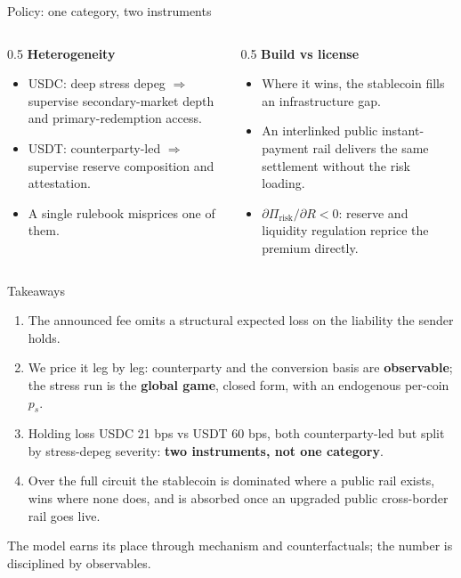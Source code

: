 \documentclass[11pt,aspectratio=169]{beamer}
\newcommand{\El}{\ensuremath{\Pi_{\text{risk}}}}
\begin{document}
\begin{frame}{Policy: one category, two instruments}
\begin{columns}
\begin{column}{0.5\textwidth}
\textbf{Heterogeneity}
\begin{itemize}
  \item USDC: deep stress depeg \(\Rightarrow\) supervise secondary-market depth and primary-redemption access.
  \item USDT: counterparty-led \(\Rightarrow\) supervise reserve composition and attestation.
  \item A single rulebook misprices one of them.
\end{itemize}
\end{column}
\begin{column}{0.5\textwidth}
\textbf{Build vs license}
\begin{itemize}
  \item Where it wins, the stablecoin fills an infrastructure gap.
  \item An interlinked public instant-payment rail delivers the same settlement without the risk loading.
  \item \(\partial \El / \partial R < 0\): reserve and liquidity regulation reprice the premium directly.
\end{itemize}
\end{column}
\end{columns}
\end{frame}

\begin{frame}{Takeaways}
\begin{enumerate}
  \item The announced fee omits a structural expected loss on the liability the sender holds.
  \item We price it leg by leg: counterparty and the conversion basis are \textbf{observable};
        the stress run is the \textbf{global game}, closed form, with an endogenous per-coin \(p_s\).
  \item Holding loss USDC 21 bps vs USDT 60 bps, both counterparty-led but split by stress-depeg severity: \textbf{two instruments, not one category}.
  \item Over the full circuit the stablecoin is dominated where a public rail exists,
        wins where none does, and is absorbed once an upgraded public cross-border rail goes live.
\end{enumerate}
\vfill
\centering\small The model earns its place through mechanism and counterfactuals; the number is disciplined by observables.
\end{frame}
\end{document}
